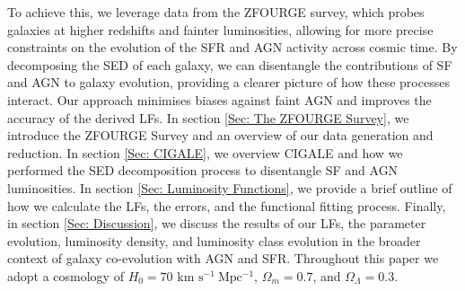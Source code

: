 To achieve this, we leverage data from the ZFOURGE survey, which probes galaxies at higher redshifts and fainter luminosities, allowing for more precise constraints on the evolution of the SFR and AGN activity across cosmic time. By decomposing the SED of each galaxy, we can disentangle the contributions of SF and AGN to galaxy evolution, providing a clearer picture of how these processes interact. Our approach minimises biases against faint AGN and improves the accuracy of the derived LFs. In section \ref{Sec: The ZFOURGE Survey}, we introduce the ZFOURGE Survey and an overview of our data generation and reduction. In section \ref{Sec: CIGALE}, we overview CIGALE and how we performed the SED decomposition process to disentangle SF and AGN luminosities. In section \ref{Sec: Luminosity Functions}, we provide a brief outline of how we calculate the LFs, the errors, and the functional fitting process. Finally, in section \ref{Sec: Discussion}, we discuss the results of our LFs, the parameter evolution, luminosity density, and luminosity class evolution in the broader context of galaxy co-evolution with AGN and SFR. Throughout this paper we adopt a cosmology of $H_0 = 70$ km $\mathrm{s^{-1}\ Mpc^{-1}}$, $\Omega_m=0.7$, and $\Omega_\Lambda=0.3$.

